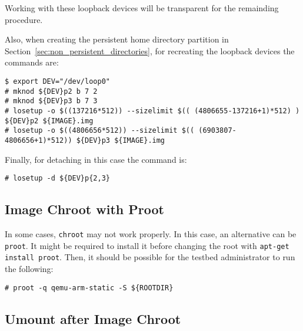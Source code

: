 Working with these loopback devices will be transparent for the remainding
procedure.

Also, when creating the persistent home directory partition in
Section~\ref{sec:non_persistent_directories}, for recreating the loopback
devices the commands are:

\begin{lstlisting}[]
$ export DEV="/dev/loop0"
# mknod ${DEV}p2 b 7 2
# mknod ${DEV}p3 b 7 3
# losetup -o $((137216*512)) --sizelimit $(( (4806655-137216+1)*512) ) ${DEV}p2 ${IMAGE}.img
# losetup -o $((4806656*512)) --sizelimit $(( (6903807-4806656+1)*512)) ${DEV}p3 ${IMAGE}.img
\end{lstlisting}
\FloatBarrier
\vspace{-5mm}

Finally, for detaching in this case the command is:
\begin{lstlisting}[]
# losetup -d ${DEV}p{2,3}
\end{lstlisting}
\FloatBarrier
\vspace{-5mm}

\subsection{Image Chroot with Proot}
\label{sec:chroot}

In some cases, \texttt{chroot} may not work properly. In this case, an
alternative can be \texttt{proot}. It might be required to install it
before changing the root with \texttt{apt-get install proot}. Then, it
should be possible for the testbed administrator to run the following:

\begin{lstlisting}[]
# proot -q qemu-arm-static -S ${ROOTDIR}
\end{lstlisting}
\FloatBarrier
\vspace{-5mm}


\subsection{Umount after Image Chroot}
\label{sec:umount}


